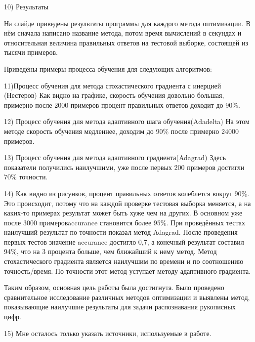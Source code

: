 10) Результаты

На слайде приведены результаты программы для каждого метода оптимизации. В нём сначала написано название метода, потом время вычислений в секундах и относительная величина правильных ответов на тестовой выборке, состоящей из тысячи примеров.

Приведёны примеры процесса обучения для следующих алгоритмов:

11)Процесс обучения для метода стохастического градиента с инерцией (Нестеров)
Как видно на графике, скорость обучения довольно большая, примерно после 2000 примеров процент правильных ответов доходит до 90\%. 

12) Процесс обучения для метода адаптивного шага обучения(Adadelta)
На этом методе скорость обучения медленнее, доходим до 90\% после примерно 24000 примеров. 

13) Процесс обучения для метода адаптивного градиента(Adagrad)
Здесь показатели получились наилучшими, уже после первых 200 примеров достигли 70\% точности. 

14) Как видно из рисунков, процент правильных ответов колеблется вокруг 90\%. Это происходит, потому что на каждой проверке тестовая выборка меняется, а на каких-то примерах результат может быть хуже чем на других. В основном уже после 3000 примеров\ttfamily accurance \normalfont становится более 95\%. При проведённых тестах наилучший результат по точности показал метод \ttfamily Adagrad\normalfont. После проведения первых тестов значение \ttfamily accurance \normalfont достигло 0,7, а конечный результат составил 94\%, что на 3 процента больше, чем ближайший к нему метод. Метод стохастического градиента является наилучшим по времени и по соотношению точность/время. По точности этот метод уступает методу адаптивного градиента.

Таким образом, основная цель работы была достигнута. Было проведено сравнительное исследование различных методов оптимизации и выявлены метод, показывающие наилучшие результаты для задачи распознавания рукописных цифр.

15) Мне осталось только указать источники, используемые в работе.